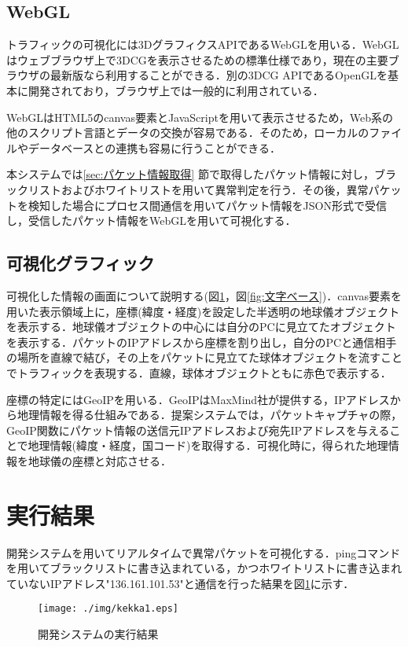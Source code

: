 \documentclass{thesis}
\begin{document}
\subsection*{WebGL}
トラフィックの可視化には3DグラフィクスAPIであるWebGLを用いる．WebGLはウェブブラウザ上で3DCGを表示させるための標準仕様であり，現在の主要ブラウザの最新版なら利用することができる．別の3DCG APIであるOpenGLを基本に開発されており，ブラウザ上では一般的に利用されている．

WebGLはHTML5のcanvas要素とJavaScriptを用いて表示させるため，Web系の他のスクリプト言語とデータの交換が容易である．そのため，ローカルのファイルやデータベースとの連携も容易に行うことができる．

本システムでは\ref{sec:パケット情報取得} 節で取得したパケット情報に対し，ブラックリストおよびホワイトリストを用いて異常判定を行う．その後，異常パケットを検知した場合にプロセス間通信を用いてパケット情報をJSON形式で受信し，受信したパケット情報をWebGLを用いて可視化する．

\subsection*{可視化グラフィック}
可視化した情報の画面について説明する(図\ref{fig:実行結果}，図\ref{fig:文字ベース})．canvas要素を用いた表示領域上に，座標(緯度・経度)を設定した半透明の地球儀オブジェクトを表示する．地球儀オブジェクトの中心には自分のPCに見立てたオブジェクトを表示する．パケットのIPアドレスから座標を割り出し，自分のPCと通信相手の場所を直線で結び，その上をパケットに見立てた球体オブジェクトを流すことでトラフィックを表現する．直線，球体オブジェクトともに赤色で表示する．

座標の特定にはGeoIPを用いる．GeoIPはMaxMind社が提供する，IPアドレスから地理情報を得る仕組みである．提案システムでは，パケットキャプチャの際，GeoIP関数にパケット情報の送信元IPアドレスおよび宛先IPアドレスを与えることで地理情報(緯度・経度，国コード)を取得する．可視化時に，得られた地理情報を地球儀の座標と対応させる．

\section{実行結果} \label{sec:実行結果}

開発システムを用いてリアルタイムで異常パケットを可視化する．pingコマンドを用いてブラックリストに書き込まれている，かつホワイトリストに書き込まれていないIPアドレス"136.161.101.53"と通信を行った結果を図\ref{fig:実行結果}に示す．

\begin{figure}[H]
 \center
 \texttt{[image: ./img/kekka1.eps]}
 \caption{開発システムの実行結果}
 \label{fig:実行結果}
\end{figure}
\end{document}
